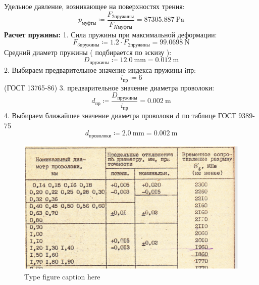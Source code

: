 \documentclass{article}
\newcommand{\defeq}{\coloneq} %
\begin{document}
\colorbox[HTML]{000000}{Удельное давление, возникающее на поверхностях трения:}\newline
\begin{equation*}
p_{муфты} \defeq \frac{\textit{F}_{\textit{2пружины}}}{F_{Kмуфты}} = {87305.887 \: \mathrm{Pa}}
\end{equation*}
\colorbox[HTML]{000000}{\textbf{Расчет пружины:}}\newline
\colorbox[HTML]{000000}{1. Сила пружины при максимальной деформации:}\newline
\begin{equation*}
\textit{F}_{\textit{3пружины}} \defeq 1.2 \cdot \textit{F}_{\textit{2пружины}} = {99.0698 \: \mathrm{N}}
\end{equation*}
\colorbox[HTML]{000000}{Средний диаметр пружины ( подбирается по эскизу ):}\newline
\begin{equation*}
D_{пружины} \defeq 12.0 \: \mathrm{mm} = {0.012 \: \mathrm{m}}
\end{equation*}
\colorbox[HTML]{000000}{2. Выбираем предварительное значение индекса пружины iпр: }\newline
\begin{equation*}
i_{пр} \defeq 6
\end{equation*}
\colorbox[HTML]{000000}{(ГОСТ 13765-86)}\newline
\colorbox[HTML]{000000}{3. предварительное значение диаметра проволоки:}\newline
\begin{equation*}
d_{пр} \defeq \frac{D_{пружины}}{i_{пр}} = {0.002 \: \mathrm{m}}
\end{equation*}
\colorbox[HTML]{000000}{4. Выбираем ближайшее значение диаметра проволоки d по таблице ГОСТ 9389-75}\newline
\begin{equation*}
d_{проволоки} \defeq 2.0 \: \mathrm{mm} = {0.002 \: \mathrm{m}}
\end{equation*}
\begin{figure}[h!]
 \begin{center}
  \includegraphics[max width=\textwidth]{calculations/674.png}
  \caption{Type figure caption here}
  \label{fig:674}
 \end{center}
\end{figure}
\end{document}
